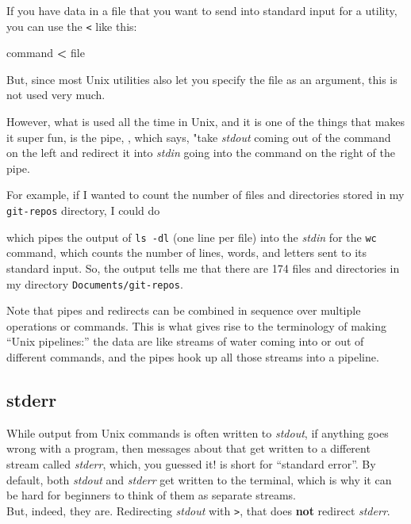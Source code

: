 \documentclass[]{krantz}
\makeatletter
\newenvironment{Shaded}{\begin{snugshade}}{\end{snugshade}}
\newcommand{\BuiltInTok}[1]{#1}
\newcommand{\ExtensionTok}[1]{#1}
\newcommand{\FunctionTok}[1]{\textcolor[rgb]{0,0,0}{#1}}
\newcommand{\KeywordTok}[1]{\textcolor[rgb]{0.27,0.27,0.27}{\textbf{#1}}}
\newcommand{\NormalTok}[1]{#1}
\newcommand{\OperatorTok}[1]{\textcolor[rgb]{0.43,0.43,0.43}{\textbf{#1}}}
\newenvironment{kframe}{%
\medskip{}
\setlength{\fboxsep}{.8em}
 \def\at@end@of@kframe{}%
 \ifinner\ifhmode%
  \def\at@end@of@kframe{\end{minipage}}%
  \begin{minipage}{\columnwidth}%
 \fi\fi%
 \def\FrameCommand##1{\hskip\@totalleftmargin \hskip-\fboxsep
 \colorbox{shadecolor}{##1}\hskip-\fboxsep
     \hskip-\linewidth \hskip-\@totalleftmargin \hskip\columnwidth}%
 \MakeFramed {\advance\hsize-\width
   \@totalleftmargin\z@ \linewidth\hsize
   \@setminipage}}%
 {\par\unskip\endMakeFramed%
 \at@end@of@kframe}
\renewenvironment{Shaded}{\begin{kframe}}{\end{kframe}}
\makeatother
\begin{document}
If you have data in a file that you want to send into standard input
for a utility, you can use the \texttt{\textless{}} like this:

\begin{Shaded}
\begin{Highlighting}[]
\BuiltInTok{command} \OperatorTok{<}\NormalTok{ file}
\end{Highlighting}
\end{Shaded}

But, since most Unix utilities also let you specify the file as an argument,
this is not used very much.

However, what is used all the time in Unix, and it is one of the things
that makes it super fun, is the pipe, \texttt{\textbar{}}, which says, "take \emph{stdout} coming
out of the command on the left and redirect it into \emph{stdin} going into
the command on the right of the pipe.

For example, if I wanted to count the number of files and directories stored in my \texttt{git-repos}
directory, I could do

\begin{Shaded}
\end{Shaded}

which pipes the output of \texttt{ls\ -dl} (one line per file) into the \emph{stdin} for the \texttt{wc} command, which
counts the number of lines, words, and letters sent to its standard input. So, the output tells
me that there are 174 files and directories in my directory \texttt{Documents/git-repos}.

Note that pipes and redirects can be combined in sequence over multiple
operations or commands. This is what gives rise to the terminology of
making ``Unix pipelines:'' the data are like streams of water coming into
or out of different commands, and the pipes hook up all those streams into
a pipeline.

\hypertarget{stderr}{%
\subsection{stderr}\label{stderr}}

While output from Unix commands is often written to \emph{stdout}, if anything goes wrong with
a program, then messages about that get written to a different stream called \emph{stderr}, which, you
guessed it! is short for ``standard error''. By default, both \emph{stdout} and \emph{stderr} get written
to the terminal, which is why it can be hard for beginners to think of them as separate streams.\\
But, indeed, they are. Redirecting \emph{stdout} with \texttt{\textgreater{}}, that does \textbf{not} redirect \emph{stderr}.
\end{document}
